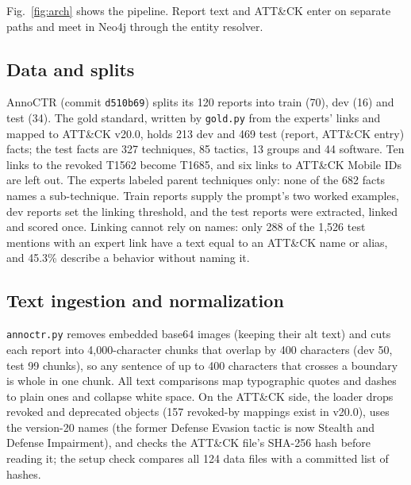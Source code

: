 \documentclass[conference,letterpaper]{IEEEtran}
\newcommand{\code}[1]{\texttt{#1}}
\begin{document}
Fig.~\ref{fig:arch} shows the pipeline. Report text and ATT\&CK enter on separate paths and meet in Neo4j through the entity resolver.

\subsection{Data and splits}
AnnoCTR (commit \code{d510b69}) splits its 120 reports into train (70), dev (16) and test (34). The gold standard, written by \code{gold.py} from the experts' links and mapped to ATT\&CK v20.0, holds 213 dev and 469 test (report, ATT\&CK entry) facts; the test facts are 327 techniques, 85 tactics, 13 groups and 44 software. Ten links to the revoked T1562 become T1685, and six links to ATT\&CK Mobile IDs are left out. The experts labeled parent techniques only: none of the 682 facts names a sub-technique. Train reports supply the prompt's two worked examples, dev reports set the linking threshold, and the test reports were extracted, linked and scored once. Linking cannot rely on names: only 288 of the 1,526 test mentions with an expert link have a text equal to an ATT\&CK name or alias, and 45.3\% describe a behavior without naming it.

\subsection{Text ingestion and normalization}
\code{annoctr.py} removes embedded base64 images (keeping their alt text) and cuts each report into 4,000-character chunks that overlap by 400 characters (dev 50, test 99 chunks), so any sentence of up to 400 characters that crosses a boundary is whole in one chunk. All text comparisons map typographic quotes and dashes to plain ones and collapse white space. On the ATT\&CK side, the loader drops revoked and deprecated objects (157 revoked-by mappings exist in v20.0), uses the version-20 names (the former Defense Evasion tactic is now Stealth and Defense Impairment), and checks the ATT\&CK file's \mbox{SHA-256} hash before reading it; the setup check compares all 124 data files with a committed list of hashes.
\end{document}
